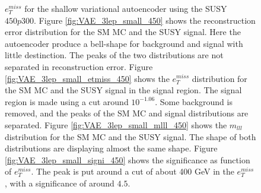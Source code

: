 \begin{figure}[H]
{    $e_T^{miss}$ for the shallow variational autoencoder using the SUSY $450p300$. 
    Figure \ref{fig:VAE_3lep_small_450} shows the reconstruction error 
    distribution for the SM MC and the SUSY signal. Here the autoencoder produce a bell-shape for background and 
    signal with little destinction. The peaks of the two distributions are not separated in reconstruction error. Figure \ref{fig:VAE_3lep_small_etmiss_450} 
    shows the $e_T^{miss}$ distribution for the SM MC and the SUSY signal in the signal region. 
    The signal region is made using a cut around $10^{-1.06}$. Some background is removed, and the peaks of the SM MC and signal 
    distributions are separated. Figure \ref{fig:VAE_3lep_small_mlll_450} shows the $m_{lll}$ distribution for the SM MC and the SUSY signal. 
    The shape of both distributions are displaying almost the same shape. Figure \ref{fig:VAE_3lep_small_signi_450} shows the significance as 
    function of $e_T^{miss}$. The peak is put around a cut of about 400 GeV in the $e_T^{miss}$, with a significance of around $4.5$.}
    \label{fig:VAE_3lep_small_rec_sig_signi_450}
\end{figure}








